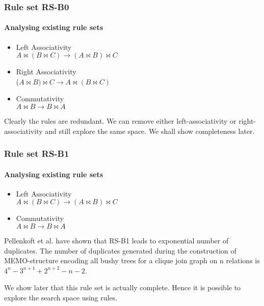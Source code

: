 \documentclass{beamer}
\begin{document}
  \begin{frame}
  \frametitle{Rule set RS-B0}
  \framesubtitle{Analysing existing rule sets}
  \begin{itemize}
	\item Left Associativity \\ $A \bowtie (B \bowtie C) \rightarrow (A \bowtie B) \bowtie C$
	\item Right Associativity \\ ($A \bowtie B) \bowtie C \rightarrow A \bowtie (B \bowtie C)$
	\item Commutativity \\ $A \bowtie B \rightarrow B \bowtie A$
\end{itemize}

  Clearly the rules are redundant. We can remove either left-associativity or right-associativity and still explore the same space. We shall show completeness later.
  \end{frame}
  
  \begin{frame}
  \frametitle{Rule set RS-B1}
  \framesubtitle{Analysing existing rule sets}
\begin{itemize}
	\item Left Associativity \\ $A \bowtie (B \bowtie C) \rightarrow (A \bowtie B) \bowtie C$
	\item Commutativity \\ $A \bowtie B \rightarrow B \bowtie A$
\end{itemize}

Pellenkoft et al. have shown that RS-B1 leads to exponential number of duplicates. The number of duplicates generated during the construction of MEMO-structure encoding all bushy trees for a clique join graph on n relations is $4^{n}-3^{n+1}+2^{n+2}-n-2$.

We show later that this rule set is actually complete. Hence it is possible to explore the search space using rules.
  \end{frame}
  
\end{document}
